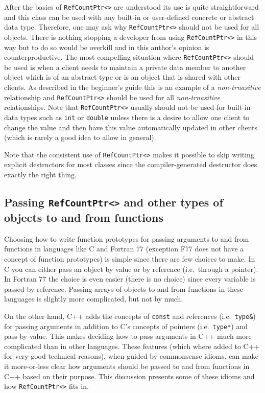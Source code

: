 After the basics of {}\texttt{RefCountPtr<>} are understood its use is
quite straightforward and this class can be used with any built-in or
user-defined concrete or abstract data type.  Therefore, one may ask
why {}\texttt{RefCountPtr<>} should not be used for all objects.
There is nothing stopping a developer from using
{}\texttt{RefCountPtr<>} in this way but to do so would be overkill
and in this author's opinion is counterproductive.  The most
compelling situation where {}\texttt{Ref\-Count\-Ptr<>} should be used
is when a client needs to maintain a private data member to another
object which is of an abstract type or is an object that is shared
with other clients.  As described in the beginner's guide
{}\cite{ref:RefCountPtrBeginnersGuide} this is an example of a
{}\textit{non-trnasitive} relationship and
{}\texttt{Ref\-Count\-Ptr<>} should be used for all
{}\textit{non-trnasitive} relationships.  Note that
{}\texttt{RefCountPtr<>} usually should not be used for built-in data
types such as {}\texttt{int} or {}\texttt{double} unless there is a
desire to allow one client to change the value and then have this
value automatically updated in other clients (which is rarely a good
idea to allow in general).

Note that the consistent use of {}\texttt{RefCountPtr<>} makes it
possible to skip writing explicit destructors for most classes since
the compiler-generated destructor does exactly the right thing.

%
\subsection{Passing {}\texttt{RefCountPtr<>} and other types of objects to and from functions}
\label{rcp:sec:passing-args}
%

Choosing how to write function prototypes for passing arguments to and
from functions in languages like C and Fortran 77 (exception F77 does
not have a concept of function prototypes) is simple since there are
few choices to make.  In C you can either pass an object by value or
by reference (i.e.~through a pointer).  In Fortran 77 the choice is
even easier (there is no choice) since every variable is passed by
reference.  Passing arrays of objects to and from functions in these
languages is slightly more complicated, but not by much.

On the other hand, C++ adds the concepts of {}\texttt{const} and
references (i.e.~{}\texttt{type\&}) for passing arguments in addition
to C's concepts of pointers (i.e.~{}\texttt{type*}) and pass-by-value.
This makes deciding how to pass arguments in C++ much more complicated
than in other languages.  These features (which where added to C++ for
very good technical reasons), when guided by commonsense idioms, can
make it more-or-less clear how arguments should be passed to and from
functions in C++ based on their purpose.  This discussion presents
some of these idioms and how {}\texttt{RefCountPtr<>} fits in.

